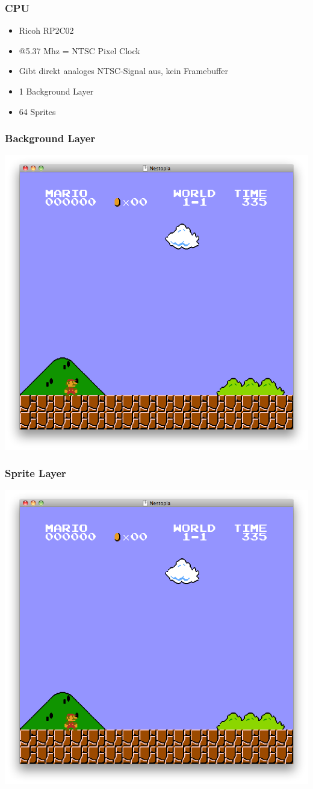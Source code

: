 \documentclass{beamer}
\begin{document}
    \begin{frame}
        \frametitle{CPU}
        \begin{itemize}
            \item{Ricoh RP2C02}
            \item{@5.37 Mhz = NTSC Pixel Clock}
            \item{Gibt direkt analoges NTSC-Signal aus, kein Framebuffer}
            \item{1 Background Layer}
            \item{64 Sprites}
        \end{itemize}
    \end{frame}
    
    \begin{frame}
        \frametitle{Background Layer}
        \includegraphics[width=0.8\linewidth]{img/smb_bg.png}
    \end{frame}
    
    
    \begin{frame}
        \frametitle{Sprite Layer}
        \includegraphics[width=0.8\linewidth]{img/smb_sprite.png}
    \end{frame}
    
\end{document}

